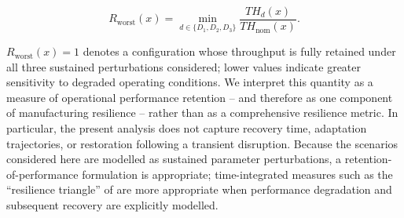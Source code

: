 \documentclass[a4paper,fleqn]{cas-sc}
\begin{document}
  \begin{equation}                                                                                                                          
  R_\mathrm{worst}(x)                                                                                                                       
  =                                                                                                                                         
  \min_{d \in \{D_1,D_2,D_3\}}                              
  \frac{TH_d(x)}{TH_\mathrm{nom}(x)}.                                                                                                       
  \end{equation}                                                                                                                            
                                                                                                                                            
  $R_\mathrm{worst}(x)=1$ denotes a configuration whose throughput is                                                                       
  fully retained under all three sustained perturbations considered;                                                                        
  lower values indicate greater sensitivity to degraded operating                                                                           
  conditions. We interpret this quantity as a measure of operational                                                                        
  performance retention -- and therefore as one component of manufacturing                                                                  
  resilience -- rather than as a comprehensive resilience metric. In                                                                        
  particular, the present analysis does not capture recovery time,                                                                          
  adaptation trajectories, or restoration following a transient                                                                             
  disruption. Because the scenarios considered here are modelled as                                                                         
  sustained parameter perturbations, a retention-of-performance                                                                             
  formulation is appropriate; time-integrated measures such as the                                                                          
  ``resilience triangle'' of \citet{Bruneau2003} are more appropriate when                                                                  
  performance degradation and subsequent recovery are explicitly modelled.                                                                  
                                                                                                                                            
\end{document}
